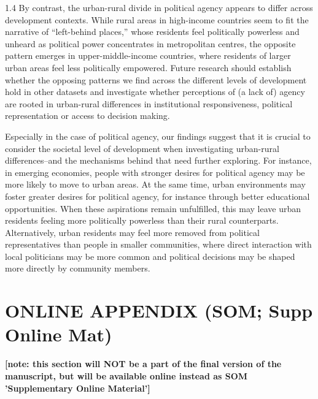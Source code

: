 \documentclass[10pt, letterpaper]{article}
\begin{document}
\begin{spacing}{1.4}
By contrast, the urban-rural divide in political agency appears to differ across development contexts.
While rural areas in high-income countries seem to fit the narrative of
``left-behind places,''
\citep[][]{ulrich2021people,rodriguez2018revenge}
  whose residents feel politically powerless and
unheard as political power concentrates in metropolitan centres, the opposite pattern emerges in
upper-middle-income countries, where residents of larger urban areas feel less politically empowered.
Future research should establish whether the opposing patterns we find across the different levels of
development hold in other datasets and investigate whether perceptions of (a lack of) agency are
rooted in urban-rural differences in institutional responsiveness, political representation or access to
decision making.

Especially in the case of political agency, our findings suggest that it is crucial to
consider the societal level of development when investigating urban-rural differences--and the
mechanisms behind that need further exploring. For instance, in emerging economies, people with
stronger desires for political agency may be more likely to move to urban areas. At the same time,
urban environments may foster greater desires for political agency, for instance through better
educational opportunities. When these aspirations remain unfulfilled, this may leave urban residents
feeling more politically powerless than their rural counterparts. Alternatively, urban residents may feel
more removed from political representatives than people in smaller communities, where direct
interaction with local politicians may be more common and political decisions may be shaped more
directly by community members.


%
%



\clearpage
\setcounter{section}{0}
 \part*{\Huge ONLINE APPENDIX (SOM; Supp Online Mat)} %
 \textbf{[note: this section will NOT be a part of the final version of
   the manuscript, but will be available online instead as SOM 'Supplementary Online
   Material']} %


\end{spacing}
\end{document}
